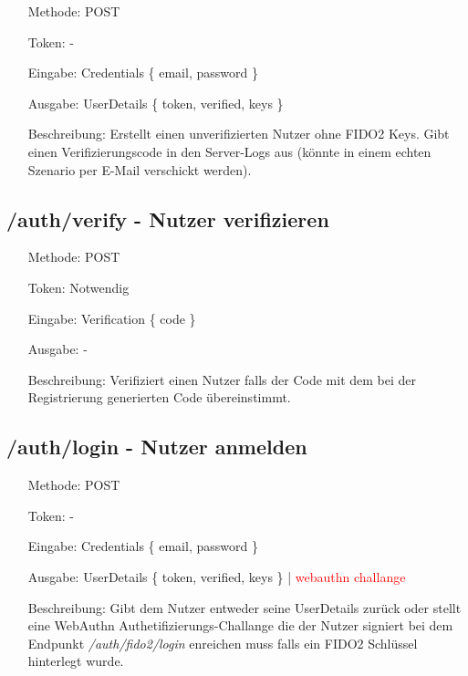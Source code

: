 \documentclass[journal]{IEEEtran}
\begin{document}
\begin{itemize}
	\setlength{\leftskip}{1.5cm}
	\setlength{\itemsep}{0pt}
	\item[Methode:] POST
	\item[Token:] -
	\item[Eingabe:] Credentials \{ email, password \}
	\item[Ausgabe:] UserDetails \{ token, verified, keys \}
	\item[Beschreibung:] Erstellt einen unverifizierten Nutzer ohne FIDO2 Keys.
		Gibt einen Verifizierungscode in den Server-Logs aus (könnte in einem
		echten Szenario per E-Mail verschickt werden).
\end{itemize}

\subsection{/auth/verify - Nutzer verifizieren}

\begin{itemize}
	\setlength{\leftskip}{1.5cm}
	\setlength{\itemsep}{0pt}
	\item[Methode:] POST
	\item[Token:] Notwendig
	\item[Eingabe:] Verification \{ code \}
	\item[Ausgabe:] -
	\item[Beschreibung:] Verifiziert einen Nutzer falls der Code mit dem bei
		der Registrierung generierten Code übereinstimmt.
\end{itemize}


\subsection{/auth/login - Nutzer anmelden}

\begin{itemize}
	\setlength{\leftskip}{1.5cm}
	\setlength{\itemsep}{0pt}
	\item[Methode:] POST
	\item[Token:] -
	\item[Eingabe:] Credentials \{ email, password \}
	\item[Ausgabe:] UserDetails \{ token, verified, keys \} | \textcolor{red}{webauthn challange}
	\item[Beschreibung:] Gibt dem Nutzer entweder seine UserDetails zurück oder
		stellt eine WebAuthn Authetifizierungs-Challange die der Nutzer
		signiert bei dem Endpunkt \textit{/auth/fido2/login} enreichen muss
		falls ein FIDO2 Schlüssel hinterlegt wurde.
\end{itemize}
\end{document}

